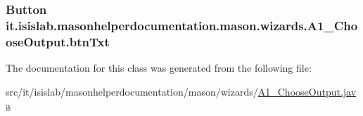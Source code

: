 \hypertarget{classit_1_1isislab_1_1masonhelperdocumentation_1_1mason_1_1wizards_1_1_a1___choose_output_a4332e3cc38ddfd02242b707d92333cd3}{
\subsubsection[{btn\-Txt}]{\setlength{\rightskip}{0pt plus 5cm}Button it.\-isislab.\-masonhelperdocumentation.\-mason.\-wizards.\-A1\-\_\-\-Choose\-Output.\-btn\-Txt\hspace{0.3cm}{\ttfamily [package]}}}\label{classit_1_1isislab_1_1masonhelperdocumentation_1_1mason_1_1wizards_1_1_a1___choose_output_a4332e3cc38ddfd02242b707d92333cd3}


The documentation for this class was generated from the following file\-:\begin{DoxyCompactItemize}
\item 
src/it/isislab/masonhelperdocumentation/mason/wizards/\hyperlink{_a1___choose_output_8java}{A1\-\_\-\-Choose\-Output.\-java}\end{DoxyCompactItemize}
